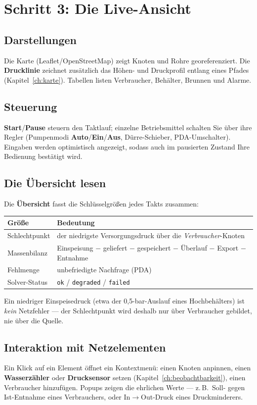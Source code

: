 \documentclass[11pt,a4paper,parskip=half]{scrreprt}
\newcommand{\ui}[1]{\textsf{\bfseries #1}}      %
\begin{document}
\section{Schritt 3: Die Live-Ansicht}

\subsection{Darstellungen}
Die Karte (Leaflet/OpenStreetMap) zeigt Knoten und Rohre georeferenziert. Die
\ui{Drucklinie} zeichnet zusätzlich das Höhen- und Druckprofil entlang eines
Pfades (Kapitel~\ref{ch:karte}). Tabellen listen Verbraucher, Behälter, Brunnen
und Alarme.

\subsection{Steuerung}
\ui{Start}/\ui{Pause} steuern den Taktlauf; einzelne Betriebsmittel schalten Sie
über ihre Regler (Pumpenmodi \ui{Auto}/\ui{Ein}/\ui{Aus}, Dürre-Schieber,
PDA-Umschalter). Eingaben werden optimistisch angezeigt, sodass auch im
pausierten Zustand Ihre Bedienung bestätigt wird.

\subsection{Die Übersicht lesen}
Die \ui{Übersicht} fasst die Schlüsselgrößen jedes Takts zusammen:

\begin{center}
\small
\begin{tabularx}{\linewidth}{@{}lX@{}}
\toprule
Größe & Bedeutung \\
\midrule
Schlechtpunkt & der niedrigste Versorgungsdruck über die \emph{Verbraucher}-Knoten \\
Massenbilanz & Einspeisung $-$ geliefert $-$ gespeichert $-$ Überlauf $-$ Export $-$ Entnahme \\
Fehlmenge & unbefriedigte Nachfrage (PDA) \\
Solver-Status & \texttt{ok} / \texttt{degraded} / \texttt{failed} \\
\bottomrule
\end{tabularx}
\end{center}

Ein niedriger Einspeisedruck (etwa der 0{,}5-bar-Auslauf eines Hochbehälters) ist
\emph{kein} Netzfehler — der Schlechtpunkt wird deshalb nur über Verbraucher
gebildet, nie über die Quelle.

\subsection{Interaktion mit Netzelementen}
Ein Klick auf ein Element öffnet ein Kontextmenü: einen Knoten anpinnen, einen
\ui{Wasserzähler} oder \ui{Drucksensor} setzen (Kapitel~\ref{ch:beobachtbarkeit}),
einen Verbraucher hinzufügen. Popups zeigen die ehrlichen Werte — z.\,B.\ Soll-
gegen Ist-Entnahme eines Verbrauchers, oder In$\to$Out-Druck eines
Druckminderers.
\end{document}
